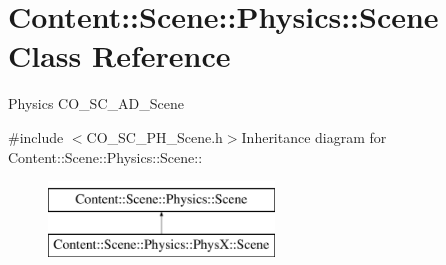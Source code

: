 \hypertarget{classContent_1_1Scene_1_1Physics_1_1Scene}{
\section{Content::Scene::Physics::Scene Class Reference}
\label{classContent_1_1Scene_1_1Physics_1_1Scene}
}


Physics CO\_\-SC\_\-AD\_\-Scene  


{\ttfamily \#include $<$CO\_\-SC\_\-PH\_\-Scene.h$>$}Inheritance diagram for Content::Scene::Physics::Scene::\begin{figure}[H]
\begin{center}
\leavevmode
\includegraphics[height=2cm]{classContent_1_1Scene_1_1Physics_1_1Scene}
\end{center}
\end{figure}
